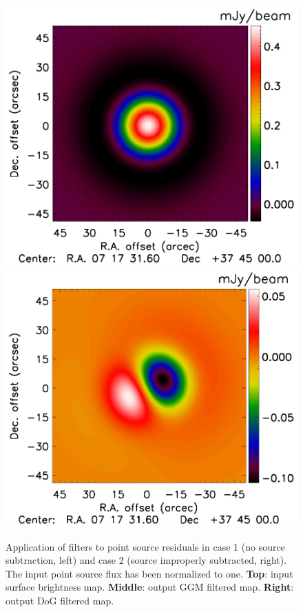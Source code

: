 \documentclass[twocolumn,traditabstract]{aa}
\begin{document}
\begin{figure}[h]
\includegraphics[trim=0cm 0.7cm 0cm 0cm, clip=true, totalheight=3.4cm]{Figure/PSalone_DoG_PointSource_15_15_45.pdf}
\includegraphics[trim=0cm 0.7cm 0cm 0cm, clip=true, totalheight=3.4cm]{Figure/PSalone_DoG_PointSourceResidual_15_15_45.pdf}
\caption{\footnotesize{Application of filters to point source residuals in case 1 (no source subtraction, left) and case 2 (source improperly subtracted, right). The input point source flux has been normalized to one. {\bf Top}: input surface brightness map. {\bf Middle}: output GGM filtered map. {\bf Right}: output DoG filtered map.}}
\label{fig:Point_source_maps}
\end{figure}
\end{document}
